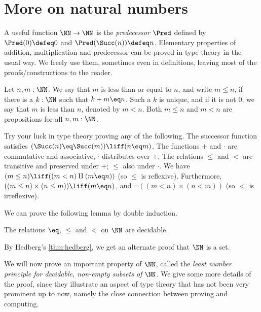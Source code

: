 \section{More on natural numbers}
\label{sec:more-on-N}

A useful function $\NN\to\NN$ is the \emph{predecessor} $\Pred$ defined by
$\Pred(0)\defeq 0$ and $\Pred(\Succ(n))\defeq n$.
Elementary properties of addition, multiplication and predecessor
can be proved in type theory in the usual way.
We freely use them, sometimes even in definitions, leaving most of the
proofs/constructions to the reader.

\begin{definition}
\label{def:orderonN}
Let $n,m:\NN$. We say that $m$ is less than or equal to $n$, and write $m\leq n$,
if there is a $k:\NN$ such that $k+m \eq n$. Such a $k$ is unique, and if it
is not $0$, we say that $m$ is less than $n$, denoted by $m<n$.
Both $m\leq n$ and $m<n$ are propositions for all $n,m:\NN$.
\end{definition}

\begin{xca}\label{xca:try-your-luck-N}
Try your luck in type theory proving any of the following.
The successor function satisfies $(\Succ(n) \eq \Succ(m))\liff(n \eq m)$.
The functions $+$ and $\cdot$ are commutative and associative,
$\cdot$ distributes over $+$.
The relations $\leq$ and $<$ are transitive and
preserved under $+$; $\leq$ also under $\cdot$.
We have $(m\leq n) \liff ((m<n)\amalg(m \eq n))$ (so $\leq$ is reflexive).
Furthermore, $((m\leq n)\times (n\leq m)) \liff (m \eq n)$,
and $\neg ((m<n)\times(n<m))$ (so $<$ is irreflexive).
\end{xca}

We can prove the following lemma by double induction.

\begin{lemma}\label{lem:dec-eq+order-N}
The relations $\eq$, $\leq$ and $<$ on $\NN$ are decidable.
\end{lemma}
By Hedberg's \cref{thm:hedberg}, we get an alternate proof that $\NN$ is a set.

We will now prove an important property of $\NN$, called the
\emph{least number principle for decidable, non-empty subsets of} $\NN$.
We give some more details of the proof, since they illustrate an aspect
of type theory that has not been very prominent up to now, namely
the close connection between proving and computing.


